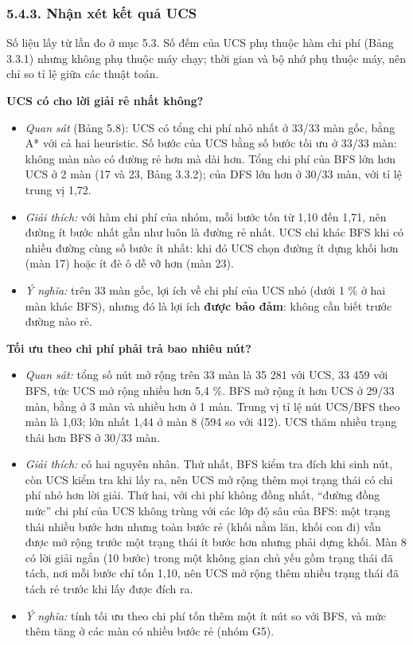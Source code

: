 \subsubsection{5.4.3. Nhận xét kết quả UCS}

Số liệu lấy từ lần đo ở mục 5.3. Số đếm của UCS phụ thuộc hàm chi phí (Bảng 3.3.1) nhưng không phụ thuộc máy chạy; thời gian và bộ nhớ phụ thuộc máy, nên chỉ so tỉ lệ giữa các thuật toán.

\textbf{UCS có cho lời giải rẻ nhất không?}

\begin{itemize}
\tightlist
\item
  \emph{Quan sát} (Bảng 5.8): UCS có tổng chi phí nhỏ nhất ở 33/33 màn gốc, bằng A* với cả hai heuristic. Số bước của UCS bằng số bước tối ưu ở 33/33 màn: không màn nào có đường rẻ hơn mà dài hơn. Tổng chi phí của BFS lớn hơn UCS ở 2 màn (17 và 23, Bảng 3.3.2); của DFS lớn hơn ở 30/33 màn, với tỉ lệ trung vị 1,72.
\item
  \emph{Giải thích:} với hàm chi phí của nhóm, mỗi bước tốn từ 1,10 đến 1,71, nên đường ít bước nhất gần như luôn là đường rẻ nhất. UCS chỉ khác BFS khi có nhiều đường cùng số bước ít nhất: khi đó UCS chọn đường ít dựng khối hơn (màn 17) hoặc ít đè ô dễ vỡ hơn (màn 23).
\item
  \emph{Ý nghĩa:} trên 33 màn gốc, lợi ích về chi phí của UCS nhỏ (dưới 1 \% ở hai màn khác BFS), nhưng đó là lợi ích \textbf{được bảo đảm}: không cần biết trước đường nào rẻ.
\end{itemize}

\textbf{Tối ưu theo chi phí phải trả bao nhiêu nút?}

\begin{itemize}
\tightlist
\item
  \emph{Quan sát:} tổng số nút mở rộng trên 33 màn là 35 281 với UCS, 33 459 với BFS, tức UCS mở rộng nhiều hơn 5,4 \%. BFS mở rộng ít hơn UCS ở 29/33 màn, bằng ở 3 màn và nhiều hơn ở 1 màn. Trung vị tỉ lệ nút UCS/BFS theo màn là 1,03; lớn nhất 1,44 ở màn 8 (594 so với 412). UCS thăm nhiều trạng thái hơn BFS ở 30/33 màn.
\item
  \emph{Giải thích:} có hai nguyên nhân. Thứ nhất, BFS kiểm tra đích khi sinh nút, còn UCS kiểm tra khi lấy ra, nên UCS mở rộng thêm mọi trạng thái có chi phí nhỏ hơn lời giải. Thứ hai, với chi phí không đồng nhất, ``đường đồng mức'' chi phí của UCS không trùng với các lớp độ sâu của BFS: một trạng thái nhiều bước hơn nhưng toàn bước rẻ (khối nằm lăn, khối con đi) vẫn được mở rộng trước một trạng thái ít bước hơn nhưng phải dựng khối. Màn 8 có lời giải ngắn (10 bước) trong một không gian chủ yếu gồm trạng thái đã tách, nơi mỗi bước chỉ tốn 1,10, nên UCS mở rộng thêm nhiều trạng thái đã tách rẻ trước khi lấy được đích ra.
\item
  \emph{Ý nghĩa:} tính tối ưu theo chi phí tốn thêm một ít nút so với BFS, và mức thêm tăng ở các màn có nhiều bước rẻ (nhóm G5).
\end{itemize}

